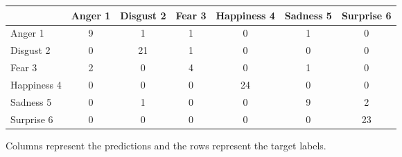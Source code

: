 \begin{figure}[h]
\begin{center}
    \begin{tabular}{ | l || c | c | c | c | c | c | }
    \hline
          & Anger 1 & Disgust 2 & Fear 3 & Happiness 4 & Sadness 5 & Surprise 6 \\ \hline \hline
        Anger 1 & 9 & 1 & 1 & 0 & 1 & 0 \\ \hline
        Disgust 2 & 0 & 21 & 1 & 0 & 0 & 0 \\ \hline
        Fear 3 & 2 & 0 & 4 & 0 & 1 & 0 \\ \hline
        Happiness 4 & 0 & 0 & 0 & 24 & 0 & 0 \\ \hline
        Sadness 5 & 0 & 1 & 0 & 0 & 9 & 2 \\ \hline
        Surprise 6 & 0 & 0 & 0 & 0 & 0 & 23 \\ \hline
    \end{tabular}
    \caption{Columns represent the predictions and the rows represent the target labels.}
    \label{fig:confusionMatrix}
\end{center}
\end{figure}
